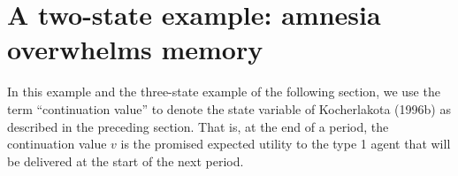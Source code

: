 



\section{A two-state example: amnesia overwhelms
memory}\label{sec:thekink}%
In this example and the three-state example of the following
section, we use the term ``continuation value'' to denote the
state variable of Kocherlakota (1996b) as described in the
preceding section. That is, at the end of a
period, the continuation value $v$ is the promised expected
utility to the type 1 agent that will be delivered at the start of the next
period.
%

